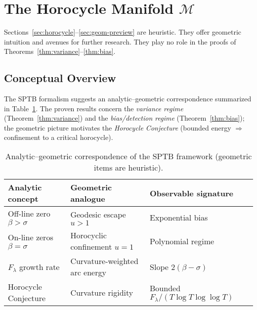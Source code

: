
\section{The Horocycle Manifold \texorpdfstring{$\mathcal{M}$}{M}}

\begin{remark}[Status]
Sections~\ref{sec:horocycle}–\ref{sec:geom-preview} are heuristic.
They offer geometric intuition and avenues for further research.
They play no role in the proofs of Theorems~\ref{thm:variance}–\ref{thm:bias}.
\end{remark}

\subsection{Conceptual Overview}

The SPTB formalism suggests an analytic–geometric correspondence summarized in
Table~\ref{tab:roadmap4}.  The proven results concern the
\emph{variance regime} (Theorem~\ref{thm:variance}) and the
\emph{bias/detection regime} (Theorem~\ref{thm:bias}); the geometric picture
motivates the \emph{Horocycle Conjecture}
(bounded energy $\Rightarrow$ confinement to a critical horocycle).

\begin{table}[h]
\centering
\caption{Analytic–geometric correspondence of the SPTB framework (geometric items are heuristic).}
\label{tab:roadmap4}
\begin{tabular}{lll}
\toprule
Analytic concept & Geometric analogue & Observable signature \\
\midrule
Off-line zero $\beta>\sigma$ & Geodesic escape $u>1$ & Exponential bias \\
On-line zeros $\beta=\sigma$ & Horocyclic confinement $u=1$ & Polynomial regime \\
$F_\lambda$ growth rate & Curvature-weighted arc energy & Slope $2(\beta-\sigma)$ \\
Horocycle Conjecture & Curvature rigidity & Bounded $F_\lambda/(T\log T\log\log T)$ \\
\bottomrule
\end{tabular}
\end{table}

